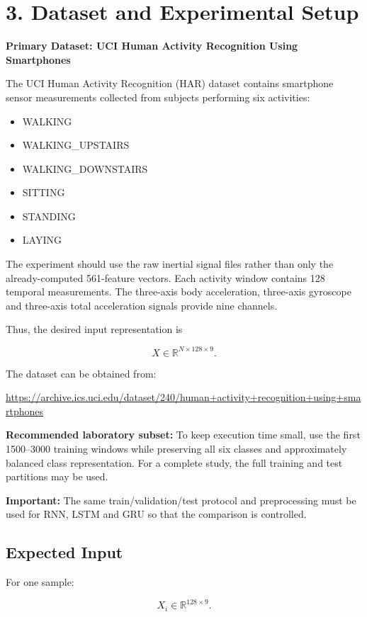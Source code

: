 \documentclass[10pt]{article}
\begin{document}
\section*{3. Dataset and Experimental Setup}

\textbf{Primary Dataset: UCI Human Activity Recognition Using Smartphones}

The UCI Human Activity Recognition (HAR) dataset contains smartphone sensor
measurements collected from subjects performing six activities:

\begin{itemize}
\item WALKING
\item WALKING\_UPSTAIRS
\item WALKING\_DOWNSTAIRS
\item SITTING
\item STANDING
\item LAYING
\end{itemize}

The experiment should use the raw inertial signal files rather than only the
already-computed 561-feature vectors. Each activity window contains 128
temporal measurements. The three-axis body acceleration, three-axis
gyroscope and three-axis total acceleration signals provide nine channels.

Thus, the desired input representation is

\[
X\in\mathbb{R}^{N\times128\times9}.
\]

The dataset can be obtained from:

\url{https://archive.ics.uci.edu/dataset/240/human+activity+recognition+using+smartphones}

\textbf{Recommended laboratory subset:} To keep execution time small, use
the first 1500--3000 training windows while preserving all six classes and
approximately balanced class representation. For a complete study, the full
training and test partitions may be used.

\textbf{Important:} The same train/validation/test protocol and preprocessing
must be used for RNN, LSTM and GRU so that the comparison is controlled.

\subsection*{Expected Input}

For one sample:

\[
X_i\in\mathbb{R}^{128\times9}.
\]
\end{document}
